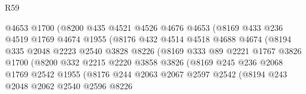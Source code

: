 \begin{lexlean}{R59}
\begin{coremodule}
                            @4653
                            @1700
                            (@8200
                              @435
                              @4521
                              @4526
                              @4676
                              @4653
                              (@8169
                                @433
                                @236
                                @4519
                                @1769
                                @4674
                                @1955
                                (@8176
                                  @432
                                  @4514
                                  @4518
                                  @4688
                                  @4674
                                  (@8194
                                    @335
                                    @2048
                                    @2223
                                    @2540
                                    @3828
                                    @8226
                                    (@8169
                                      @333
                                      @89
                                      @2221
                                      @1767
                                      @3826
                                      @1700
                                      (@8200
                                        @332
                                        @2215
                                        @2220
                                        @3858
                                        @3826
                                        (@8169
                                          @245
                                          @236
                                          @2068
                                          @1769
                                          @2542
                                          @1955
                                          (@8176
                                            @244
                                            @2063
                                            @2067
                                            @2597
                                            @2542
                                            (@8194
                                              @243
                                              @2048
                                              @2062
                                              @2540
                                              @2596
                                              @8226

\end{coremodule}
\end{lexlean}
